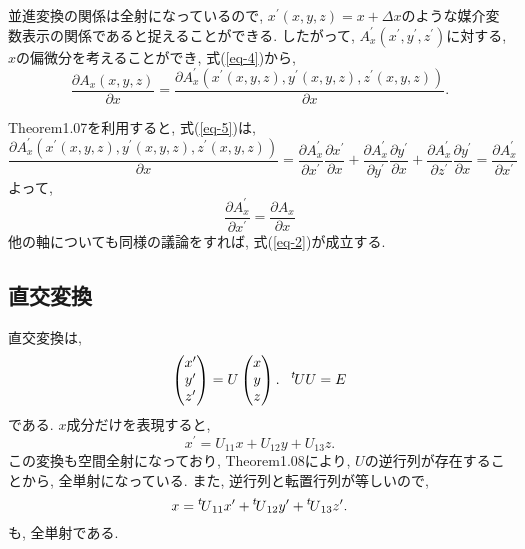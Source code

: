 \documentclass{jsarticle}
\newcommand*{\transp}[1]{\prescript{t\!}{}{#1}}
\begin{document}
並進変換の関係は全射になっているので, $x^\prime(x, y, z) = x + \Delta x$のような媒介変数表示の関係であると捉えることができる. 
したがって, $A_x^\prime(x^\prime, y^\prime, z^\prime)$に対する, $x$の偏微分を考えることができ, 式(\ref{eq-4})から, 
\begin{equation}\label{eq-5}
  \frac{\partial A_x(x, y, z)}{\partial x} = \frac{\partial A^\prime_x(x^\prime(x, y, z), y^\prime(x, y, z), z^\prime(x, y, z))}{\partial x}. 
\end{equation}

Theorem1.07を利用すると, 式(\ref{eq-5})は, 
\begin{equation}\label{eq-6}
  \frac{\partial A^\prime_x(x^\prime(x, y, z), y^\prime(x, y, z), z^\prime(x, y, z))}{\partial x}
  = \frac{\partial A^\prime_x}{\partial x^\prime}\frac{\partial x^\prime}{\partial x}
  + \frac{\partial A^\prime_x}{\partial y^\prime}\frac{\partial y^\prime}{\partial x}
  + \frac{\partial A^\prime_x}{\partial z^\prime}\frac{\partial y^\prime}{\partial x}
  = \frac{\partial A_x^\prime}{\partial x^\prime}
\end{equation}
よって, 
\begin{equation}
  \frac{\partial A^\prime_x}{\partial x^\prime} = \frac{\partial A_x}{\partial x}
\end{equation}
他の軸についても同様の議論をすれば, 式(\ref{eq-2})が成立する. 

\subsection{直交変換}
直交変換は, 
\begin{equation}
  \begin{pmatrix}
    x^\prime \\
    y^\prime \\
    z^\prime
  \end{pmatrix}
  = U 
  \begin{pmatrix}
    x \\
    y \\
    z 
  \end{pmatrix}.
  ~~
  \transp{U} U = E
\end{equation}
である. 
$x$成分だけを表現すると, 
\begin{equation}
  x^\prime = U_{11}x + U_{12}y + U_{13}z.
\end{equation}
この変換も空間全射になっており, Theorem1.08により, $U$の逆行列が存在することから, 全単射になっている. また, 逆行列と転置行列が等しいので,  
\begin{equation}\label{eq-11}
  x = \transp{U}_{11}x^\prime + \transp{U}_{12}y^\prime + \transp{U}_{13}z^\prime.
\end{equation}
も, 全単射である. 
\end{document}
